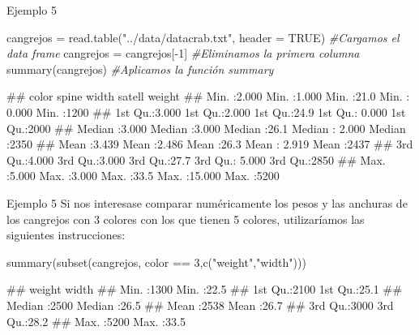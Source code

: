 \documentclass[
  ignorenonframetext,
  aspectratio=169]{beamer}
\newenvironment{Shaded}{\begin{snugshade}}{\end{snugshade}}
\newcommand{\AttributeTok}[1]{\textcolor[rgb]{0.77,0.63,0.00}{#1}}
\newcommand{\CommentTok}[1]{\textcolor[rgb]{0.56,0.35,0.01}{\textit{#1}}}
\newcommand{\ConstantTok}[1]{\textcolor[rgb]{0.00,0.00,0.00}{#1}}
\newcommand{\DecValTok}[1]{\textcolor[rgb]{0.00,0.00,0.81}{#1}}
\newcommand{\FunctionTok}[1]{\textcolor[rgb]{0.00,0.00,0.00}{#1}}
\newcommand{\NormalTok}[1]{#1}
\newcommand{\OtherTok}[1]{\textcolor[rgb]{0.56,0.35,0.01}{#1}}
\newcommand{\SpecialCharTok}[1]{\textcolor[rgb]{0.00,0.00,0.00}{#1}}
\newcommand{\StringTok}[1]{\textcolor[rgb]{0.31,0.60,0.02}{#1}}
\let\oldverbatim\verbatim
\let\endoldverbatim\endverbatim
\renewenvironment{verbatim}{\tiny\oldverbatim}{\endoldverbatim}
\begin{document}
\begin{frame}[fragile]{Ejemplo 5}
\protect\hypertarget{ejemplo-5}{}
\begin{Shaded}
\begin{Highlighting}[]
\NormalTok{cangrejos }\OtherTok{=} \FunctionTok{read.table}\NormalTok{(}\StringTok{"../data/datacrab.txt"}\NormalTok{, }\AttributeTok{header =} \ConstantTok{TRUE}\NormalTok{) }
\CommentTok{\#Cargamos el data frame}
\NormalTok{cangrejos }\OtherTok{=}\NormalTok{ cangrejos[}\SpecialCharTok{{-}}\DecValTok{1}\NormalTok{] }\CommentTok{\#Eliminamos la primera columna}
\FunctionTok{summary}\NormalTok{(cangrejos) }\CommentTok{\#Aplicamos la función summary}
\end{Highlighting}
\end{Shaded}

\begin{verbatim}
##      color           spine           width          satell           weight    
##  Min.   :2.000   Min.   :1.000   Min.   :21.0   Min.   : 0.000   Min.   :1200  
##  1st Qu.:3.000   1st Qu.:2.000   1st Qu.:24.9   1st Qu.: 0.000   1st Qu.:2000  
##  Median :3.000   Median :3.000   Median :26.1   Median : 2.000   Median :2350  
##  Mean   :3.439   Mean   :2.486   Mean   :26.3   Mean   : 2.919   Mean   :2437  
##  3rd Qu.:4.000   3rd Qu.:3.000   3rd Qu.:27.7   3rd Qu.: 5.000   3rd Qu.:2850  
##  Max.   :5.000   Max.   :3.000   Max.   :33.5   Max.   :15.000   Max.   :5200
\end{verbatim}
\end{frame}

\begin{frame}[fragile]{Ejemplo 5}
\protect\hypertarget{ejemplo-5-1}{}
Si nos interesase comparar numéricamente los pesos y las anchuras de los
cangrejos con 3 colores con los que tienen 5 colores, utilizaríamos las
siguientes instrucciones:

\begin{Shaded}
\begin{Highlighting}[]
\FunctionTok{summary}\NormalTok{(}\FunctionTok{subset}\NormalTok{(cangrejos, color }\SpecialCharTok{==} \DecValTok{3}\NormalTok{,}\FunctionTok{c}\NormalTok{(}\StringTok{"weight"}\NormalTok{,}\StringTok{"width"}\NormalTok{)))}
\end{Highlighting}
\end{Shaded}

\begin{verbatim}
##      weight         width     
##  Min.   :1300   Min.   :22.5  
##  1st Qu.:2100   1st Qu.:25.1  
##  Median :2500   Median :26.5  
##  Mean   :2538   Mean   :26.7  
##  3rd Qu.:3000   3rd Qu.:28.2  
##  Max.   :5200   Max.   :33.5
\end{verbatim}
\end{frame}
\end{document}
